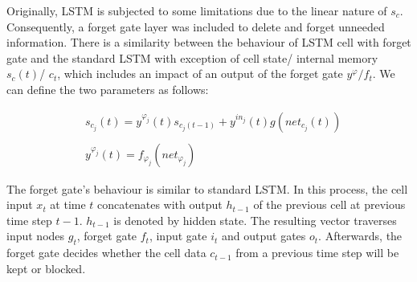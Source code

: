 Originally, \ac{LSTM} is subjected to some limitations due to the linear nature of $s_c$.
Consequently, a forget gate layer was included to delete and forget unneeded information. 
There is a similarity between the behaviour of \ac{LSTM} cell with forget gate and the standard \ac{LSTM} with exception of cell state/ internal memory $s_c(t)$/ $c_t$, which includes an impact of an output of the forget gate $y^\varphi/f_t$.
We can define the two parameters as follows:

\begin{equation}
    \begin{split}
            & s_{c_j}(t) = y^{\varphi_j} (t) s_{c_j(t-1)}+y^{in_j}(t)g(net_{c_j}(t))\\
            \\
            & y^{\varphi_j}(t)=f_{\varphi_j}(net_{\varphi_j}) 
    \end{split}
\end{equation}


The forget gate's behaviour is similar to standard \ac{LSTM}.
In this process, the cell input $x_t$ at time $t$ concatenates with output $h_{t-1}$ of the previous cell at previous time step $t-1$.
$h_{t-1}$ is denoted by hidden state. 
The resulting vector traverses input nodes $g_t$, forget gate $f_t$, input gate $i_t$ and output gates $o_t$.
Afterwards, the forget gate decides whether the cell data $c_{t-1}$ from a previous time step will be kept or blocked.